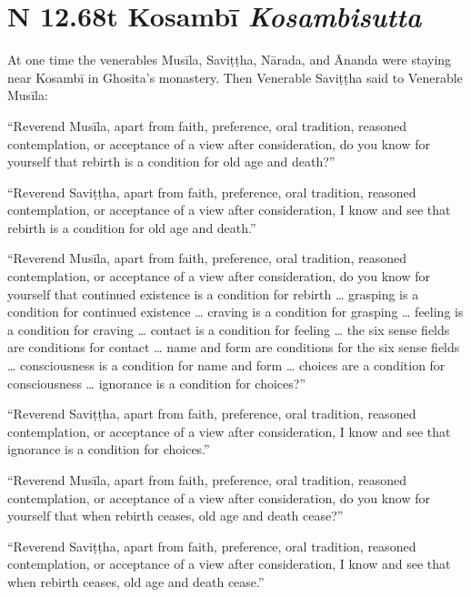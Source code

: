 \documentclass[12pt,openany]{book}%
\newcommand*{\suttatitleacronym}[1]{\smaller[2]{#1}\vspace*{.3em}}
\newcommand*{\suttatitletranslation}[1]{\linebreak{#1}}
\newcommand*{\suttatitleroot}[1]{\linebreak\smaller[2]\itshape{#1}}
\newcommand*{\tocacronym}[1]{\hspace*{-3.3em}{#1}\quad}
\newcommand*{\toctranslation}[1]{#1}
\newcommand*{\tocroot}[1]{(\textit{#1})}
\begin{document}
%
\section*{{\suttatitleacronym SN 12.68}{\suttatitletranslation At Kosambī }{\suttatitleroot Kosambisutta}}
\addcontentsline{toc}{section}{\tocacronym{SN 12.68} \toctranslation{At Kosambī } \tocroot{Kosambisutta}}

At one time the venerables \textsanskrit{Musīla}, \textsanskrit{Saviṭṭha}, \textsanskrit{Nārada}, and Ānanda were staying near \textsanskrit{Kosambī} in Ghosita’s monastery. Then Venerable \textsanskrit{Saviṭṭha} said to Venerable \textsanskrit{Musīla}: 

“Reverend \textsanskrit{Musīla}, apart from faith, preference, oral tradition, reasoned contemplation, or acceptance of a view after consideration, do you know for yourself that rebirth is a condition for old age and death?” 

“Reverend \textsanskrit{Saviṭṭha}, apart from faith, preference, oral tradition, reasoned contemplation, or acceptance of a view after consideration, I know and see that rebirth is a condition for old age and death.” 

“Reverend \textsanskrit{Musīla}, apart from faith, preference, oral tradition, reasoned contemplation, or acceptance of a view after consideration, do you know for yourself that continued existence is a condition for rebirth … grasping is a condition for continued existence … craving is a condition for grasping … feeling is a condition for craving … contact is a condition for feeling … the six sense fields are conditions for contact … name and form are conditions for the six sense fields … consciousness is a condition for name and form … choices are a condition for consciousness … ignorance is a condition for choices?” 

“Reverend \textsanskrit{Saviṭṭha}, apart from faith, preference, oral tradition, reasoned contemplation, or acceptance of a view after consideration, I know and see that ignorance is a condition for choices.” 

“Reverend \textsanskrit{Musīla}, apart from faith, preference, oral tradition, reasoned contemplation, or acceptance of a view after consideration, do you know for yourself that when rebirth ceases, old age and death cease?” 

“Reverend \textsanskrit{Saviṭṭha}, apart from faith, preference, oral tradition, reasoned contemplation, or acceptance of a view after consideration, I know and see that when rebirth ceases, old age and death cease.” 
\end{document}
